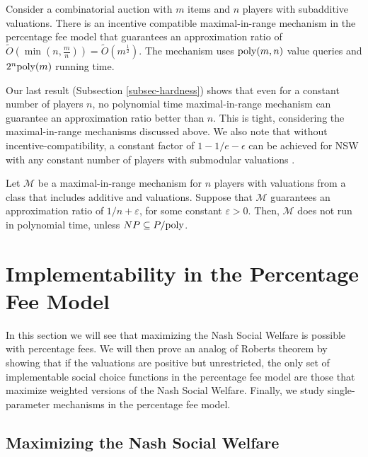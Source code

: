 \documentclass{theoretics}
\newcommand{\eps}{\varepsilon}
\newcommand{\poly}{\hbox{poly}}
\newcommand{\cM}{{\mathcal M}}
\begin{document}
\begin{theorem*}
Consider a combinatorial auction with $m$ items and $n$ players with subadditive valuations. There is an incentive compatible maximal-in-range mechanism in the percentage fee model that guarantees an approximation ratio of $\tilde O(\min(n,\frac m n))=\tilde O(m^{\frac 1 2})$. The mechanism uses $\poly(m,n)$ value queries and $2^n \poly(m)$ running time.
\end{theorem*}

Our last result (Subsection \ref{subsec-hardness}) shows that even for a constant number of players $n$, no polynomial time maximal-in-range mechanism can guarantee an approximation ratio better than $n$. This is tight, considering the maximal-in-range mechanisms discussed above. We also note that without incentive-compatibility, a constant factor of $1-1/e-\epsilon$ can be achieved for NSW with any constant number of players with submodular valuations \cite{GKK20}.


\begin{theorem*}
Let $\cM$ be a maximal-in-range mechanism for $n$ players with valuations from a class that includes additive and valuations. Suppose that $\cM$ guarantees an approximation ratio of $1/n+\eps$, for some constant $\eps>0$. Then, $\cM$ does not run in polynomial time, unless $NP\subseteq P/\poly$.
\end{theorem*}



\section{Implementability in the Percentage Fee Model}

In this section we will see that maximizing the Nash Social Welfare is possible with percentage fees. We will then prove an analog of Roberts theorem by showing that if the valuations are positive but unrestricted, the only set of implementable social choice functions in the percentage fee model are those that maximize weighted versions of the Nash Social Welfare. Finally, we study single-parameter mechanisms in the percentage fee model.

\subsection{Maximizing the Nash Social Welfare}\label{subsec-exact-nash}
\end{document}
